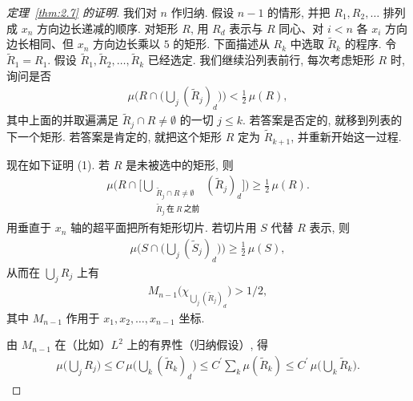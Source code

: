 \begin{proof}[定理~\ref{thm:2.7} 的证明]
我们对 $n$ 作归纳. 假设 $n-1$ 的情形, 并把 $R_1, R_2, \ldots$ 排列成 $x_n$ 方向边长递减的顺序. 对矩形 $R$, 用 $R_d$ 表示与 $R$ 同心、对 $i < n$ 各 $x_i$ 方向边长相同、但 $x_n$ 方向边长乘以 $5$ 的矩形. 下面描述从 $R_k$ 中选取 $\tilde{R}_k$ 的程序. 令 $\tilde{R}_1 = R_1$. 假设 $\tilde{R}_1, \tilde{R}_2, \ldots, \tilde{R}_k$ 已经选定. 我们继续沿列表前行, 每次考虑矩形 $R$ 时, 询问是否
\begin{align*}
  \mu\Big(R\cap\Big(\bigcup_{j}(\tilde{R}_{j})_{d}\Big)\Big)<\frac{1}{2}\,\mu(R),
\end{align*}
其中上面的并取遍满足 $\tilde{R}_j \cap R \neq \emptyset$ 的一切 $j \leq k$. 若答案是否定的, 就移到列表的下一个矩形. 若答案是肯定的, 就把这个矩形 $R$ 定为 $\tilde{R}_{k+1}$, 并重新开始这一过程.

现在如下证明 (1). 若 $R$ 是未被选中的矩形, 则
\begin{align*}
  \mu\Biggl(R\cap\Big[\bigcup_{\substack{\tilde{R}_{j}\cap R\neq\emptyset\\ \tilde{R}_{j}\ \text{在}\ R\ \text{之前}}}(\tilde{R}_{j})_{d}\Big]\Biggr)\geq\frac{1}{2}\,\mu(R).
\end{align*}
用垂直于 $x_n$ 轴的超平面把所有矩形切片. 若切片用 $S$ 代替 $R$ 表示, 则
\begin{align*}
  \mu\Big(S\cap\Big(\bigcup_{j}(\tilde{S}_{j})_{d}\Big)\Big)\geq\frac{1}{2}\,\mu(S),
\end{align*}
从而在 $\bigcup_{j}R_{j}$ 上有
\begin{align*}
  M_{n-1}\bigl(\chi_{\bigcup_{j}(\tilde{R}_{j})_{d}}\bigr)>1/2,
\end{align*}
其中 $M_{n-1}$ 作用于 $x_1, x_2, \ldots, x_{n-1}$ 坐标.

由 $M_{n-1}$ 在（比如）$L^2$ 上的有界性（归纳假设）, 得
\begin{align*}
  \mu\Big(\bigcup_{j}R_{j}\Big)\leq C\,\mu\Big(\bigcup_{k}(\tilde{R}_{k})_{d}\Big)
  \leq C^{\prime}\sum_{k}\mu(\tilde{R}_{k})
  \leq C^{\prime}\,\mu\Big(\bigcup_{k}\tilde{R}_{k}\Big).
\end{align*}


\end{proof}
